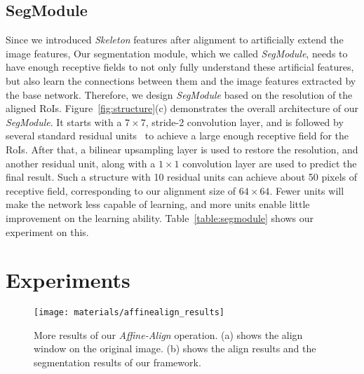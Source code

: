 \documentclass[10pt,twocolumn,letterpaper]{article}
\begin{document}
\subsection {SegModule}
\label{method:seg}
Since we introduced \emph{Skeleton} features after alignment to artificially extend the image features,  Our segmentation module, which we called \emph{SegModule}, needs to have enough receptive fields to not only fully understand these artificial features, but also learn the connections between them and the image features extracted by the base network. Therefore, we design \emph{SegModule} based on the resolution of the aligned RoIs. Figure~\ref{fig:structure}(c) demonstrates the overall architecture of our \emph{SegModule}. It starts with a $7\times7$, stride-2 convolution layer, and is followed by several standard residual units~\cite{he2016deep} to achieve
a large enough receptive field for the RoIs.
After that, a bilinear upsampling layer is used to restore the resolution, and another residual unit, along with a $1\times1$ convolution layer are used to predict the final result. 
Such a structure with 10 residual units can achieve about 50 pixels of receptive field, corresponding to our alignment size of $64\times64$. Fewer units will make the network less capable of learning, and more units enable little improvement on the learning ability. Table~\ref{table:segmodule} shows our experiment on this.



 

\section{Experiments}

\begin{figure*}[t]
\centering
\setlength{\abovecaptionskip}{0.1cm}
\setlength{\belowcaptionskip}{-0.3cm}
\texttt{[image: materials/affinealign\_results]}
\caption{More results of our \emph{Affine-Align} operation. (a) shows the align window on the original image. (b) shows the align results  and the segmentation results of our framework.}
\label{fig:affinealign_results}
\end{figure*}
\end{document}
